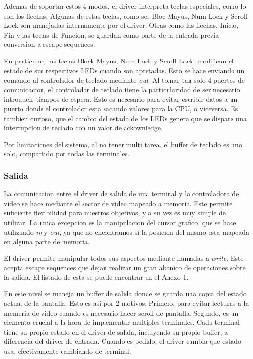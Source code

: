 \documentclass[a4paper,10pt]{article}
\begin{document}
            Ademas de soportar estos 4 modos, el driver interpreta teclas especiales, como lo son las flechas.
            Algunas de estas teclas, como ser Bloc Mayus, Num Lock y Scroll Lock son manejadas internamente por el driver.
            Otras como las flechas, Inicio, Fin y las teclas de Funcion, se guardan como parte de la entrada previa conversion a escape sequences.

            En particular, las teclas Block Mayus, Num Lock y Scroll Lock, modifican el estado de sus respectivos LEDs cuando son apretadas.
            Esto se hace enviando un comando al controlador de teclado mediante \textit{out}. 
            Al tomar tan solo 4 puertos de comunicacion, el controlador de teclado tiene la particularidad de ser necesario introducir tiempos de espera.
            Esto es necesario para evitar escribir datos a un puerto donde el controlador esta sacando valores para la CPU, o viceversa.
            Es tambien curioso, que el cambio del estado de los LEDs genera que se dispare una interrupcion de teclado con un valor de ackownledge.

            Por limitaciones del sistema, al no tener multi tarea, el buffer de teclado es uno solo, compartido por todas las terminales.

        \subsubsection{Salida}
            La comunicacion entre el driver de salida de una terminal y la controladora de video se hace mediante el sector de video mapeado a memoria.
            Este permite suficiente flexibilidad para nuestros objetivos, y a su vez es muy simple de utilizar.
            La unica excepcion es la manipulacion del cursor grafico, que se hace utilizando \textit{in} y \textit{out}, ya que no encontramos si la posicion del mismo esta mapeada en alguna parte de memoria.

            El driver permite manipular todos sus aspectos mediante llamadas a \textit{write}.
            Este acepta escape sequences que dejan realizar un gran abanico de operaciones sobre la salida.
            El listado de esta se puede encontrar en el Anexo 1.
            
            En este nivel se maneja un buffer de salida donde se guarda una copia del estado actual de la pantalla.
            Esto es asi por 2 motivos.
            Primero, para evitar lecturas a la memoria de video cuando es necesario hacer scroll de pantalla.
            Segundo, es un elemento crucial a la hora de implementar multiples terminales.
            Cada terminal tiene su propio estado en el driver de salida, incluyendo su propio buffer, a diferencia del driver de entrada.
            Cuando es pedido, el driver cambia que estado usa, efectivamente cambiando de terminal.
\end{document}
